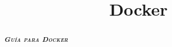 \documentclass[osajnl,showpacs,superscriptaddress,10pt]{revtex4-2}
\begin{document}
\title{Docker}
\begin{abstract}
    \begin{center}
        \vspace{300pt}
        \Large \textbf{\textit{\textsc{Guía para Docker}}} \normalsize
    \end{center}
\end{abstract}
\maketitle

\pagestyle{fancy}
\fancyhf{}
\fancyfoot[LE,RO]{\hfill\thepage\hfill}
\renewcommand{\footruleskip}{3pt}
\renewcommand{\footrulewidth}{1pt}

\newpage
\tableofcontents
\newpage



% 
% 
% 
% 

\end{document}
